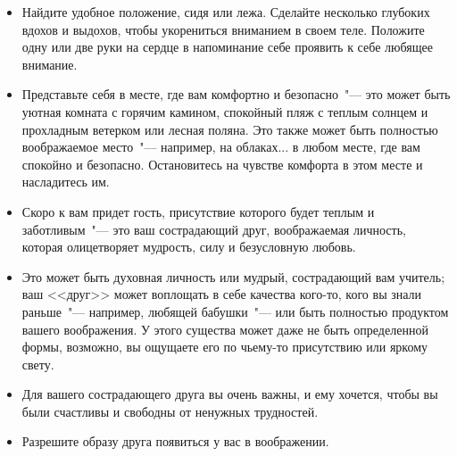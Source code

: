 \begin{itemize}
	\item Найдите удобное положение, сидя или лежа. Сделайте несколько глубоких вдохов и выдохов, чтобы укорениться вниманием в своем теле. Положите одну или две руки на сердце в напоминание себе проявить к себе любящее внимание.
\end{itemize}

\vspace{3ex}

\begin{itemize}
	\item Представьте себя в месте, где вам комфортно и безопасно~"--- это может быть уютная комната с горячим камином, спокойный пляж с теплым солнцем и прохладным ветерком или лесная поляна. Это также может быть полностью воображаемое место~"--- например, на облаках... в любом месте, где вам спокойно и безопасно. Остановитесь на чувстве комфорта в этом месте и насладитесь им.
\end{itemize}

\vspace{3ex}

\begin{itemize}
	\item Скоро к вам придет гость, присутствие которого будет теплым и заботливым~"--- это ваш сострадающий друг, воображаемая личность, которая олицетворяет мудрость, силу и безусловную любовь.
	
	\item Это может быть духовная личность или мудрый, сострадающий вам учитель; ваш <<друг>> может воплощать в себе качества кого-то, кого вы знали раньше~"--- например, любящей бабушки~"--- или быть полностью продуктом вашего воображения. У этого существа может даже не быть определенной формы, возможно, вы ощущаете его по чьему-то присутствию или яркому свету.
	
	\item Для вашего сострадающего друга вы очень важны, и ему хочется, чтобы вы были счастливы и свободны от ненужных трудностей.
	
	\item Разрешите образу друга появиться у вас в воображении.
\end{itemize}

\vspace{3ex}

